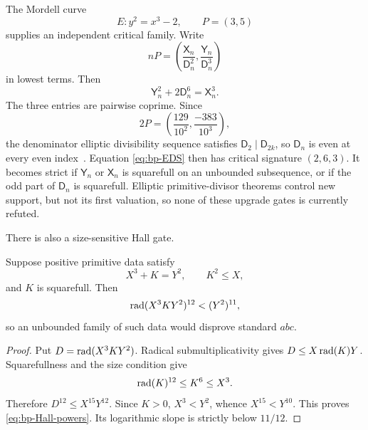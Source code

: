 The Mordell curve
\[
                         E:y^2=x^3-2,\qquad P=(3,5)
\]
supplies an independent critical family.  Write
\[
 nP=\left(\frac{\mathsf X_n}{\mathsf D_n^2},
           \frac{\mathsf Y_n}{\mathsf D_n^3}\right)
\]
in lowest terms.  Then
\begin{equation}\label{eq:bp-EDS}
                  \mathsf Y_n^2+2\mathsf D_n^6=\mathsf X_n^3.
\end{equation}
The three entries are pairwise coprime.  Since
\[
 2P=\left(\frac{129}{10^2},\frac{-383}{10^3}\right),
\]
the denominator elliptic divisibility sequence satisfies
$\mathsf D_2\mid\mathsf D_{2k}$, so $\mathsf D_n$ is even at every even
index~\cite{EverestMcLarenWard2006}.  Equation
\eqref{eq:bp-EDS} then has critical signature $(2,6,3)$.  It becomes strict
if $\mathsf Y_n$ or $\mathsf X_n$ is squarefull on an unbounded subsequence,
or if the odd part of $\mathsf D_n$ is squarefull.  Elliptic
primitive-divisor theorems control new support, but not its first valuation,
so none of these upgrade gates is currently refuted.

There is also a size-sensitive Hall gate.

\begin{proposition}
\label{prop:bp-Hall-gate}
Suppose positive primitive data satisfy
\[
                         X^3+K=Y^2,\qquad K^2\leq X,
\]
and $K$ is squarefull.  Then
\begin{equation}\label{eq:bp-Hall-powers}
       \operatorname{rad}(X^3KY^2)^{12}<(Y^2)^{11},
\end{equation}
so an unbounded family of such data would disprove standard $abc$.
\end{proposition}

\begin{proof}
Put $D=\operatorname{rad}(X^3KY^2)$.  Radical submultiplicativity gives
$D\leq X\operatorname{rad}(K)Y$.  Squarefullness and the size condition give
\[
                         \operatorname{rad}(K)^{12}\leq K^6\leq X^3.
\]
Therefore $D^{12}\leq X^{15}Y^{12}$.  Since $K>0$,
$X^3<Y^2$, whence $X^{15}<Y^{10}$.  This proves
\eqref{eq:bp-Hall-powers}.  Its logarithmic slope is strictly below $11/12$.
\end{proof}

